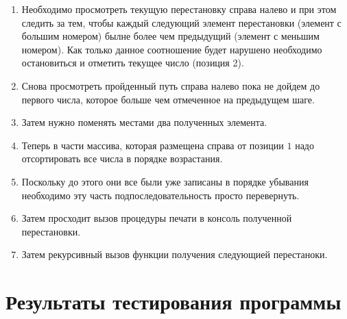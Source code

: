 \documentclass[bachelor, och, labwork]{shiza}
\begin{document}
\begin{enumerate}
    
\item Необходимо просмотреть текущую перестановку справа налево и при этом 
следить за тем, чтобы каждый следующий элемент перестановки (элемент с большим 
номером) былне более чем предыдущий (элемент с меньшим номером). Как только данное 
соотношение будет нарушено необходимо остановиться и отметить текущее число 
(позиция 2).

\item Снова просмотреть пройденный путь справа налево пока не дойдем до первого 
числа, которое больше чем отмеченное на предыдущем шаге. 

\item Затем нужно поменять местами два полученных элемента.

\item Теперь в части массива, которая размещена справа от позиции $1$ надо 
отсортировать все числа в порядке возрастания. 

\item Поскольку до этого они все были уже записаны в порядке убывания 
необходимо эту часть подпоследовательность просто перевернуть.

\item Затем просходит вызов процедуры печати в консоль полученной перестановки.

\item Затем рекурсивный вызов функции получения следующией перестаноки.

\end{enumerate}

\section{Результаты тестирования программы}
\end{document}
